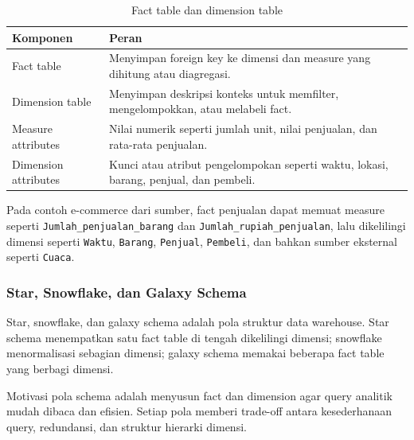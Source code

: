 \begin{table}[H]
\centering
\begin{tabularx}{\textwidth}{|L{0.24\textwidth}|X|}
\hline
\textbf{Komponen} & \textbf{Peran} \\
\hline
Fact table & Menyimpan foreign key ke dimensi dan measure yang dihitung atau diagregasi. \\
\hline
Dimension table & Menyimpan deskripsi konteks untuk memfilter, mengelompokkan, atau melabeli fact. \\
\hline
Measure attributes & Nilai numerik seperti jumlah unit, nilai penjualan, dan rata-rata penjualan. \\
\hline
Dimension attributes & Kunci atau atribut pengelompokan seperti waktu, lokasi, barang, penjual, dan pembeli. \\
\hline
\end{tabularx}
\caption{Fact table dan dimension table}
\label{tab:fact-dimension}
\end{table}

Pada contoh e-commerce dari sumber, fact penjualan dapat memuat measure seperti \texttt{Jumlah\_penjualan\_barang} dan \texttt{Jumlah\_rupiah\_penjualan}, lalu dikelilingi dimensi seperti \texttt{Waktu}, \texttt{Barang}, \texttt{Penjual}, \texttt{Pembeli}, dan bahkan sumber eksternal seperti \texttt{Cuaca}.

\subsubsection{Star, Snowflake, dan Galaxy Schema}

\begin{jawab}
Star, snowflake, dan galaxy schema adalah pola struktur data warehouse. Star schema menempatkan satu fact table di tengah dikelilingi dimensi; snowflake menormalisasi sebagian dimensi; galaxy schema memakai beberapa fact table yang berbagi dimensi.
\end{jawab}

Motivasi pola schema adalah menyusun fact dan dimension agar query analitik mudah dibaca dan efisien. Setiap pola memberi trade-off antara kesederhanaan query, redundansi, dan struktur hierarki dimensi.

